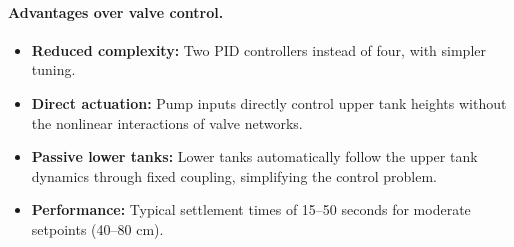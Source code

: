 \documentclass[11pt]{article}
\begin{document}
\paragraph{Advantages over valve control.}
\begin{itemize}
  \item \textbf{Reduced complexity:} Two PID controllers instead of four, with simpler tuning.
  \item \textbf{Direct actuation:} Pump inputs directly control upper tank heights without the nonlinear interactions of valve networks.
  \item \textbf{Passive lower tanks:} Lower tanks automatically follow the upper tank dynamics through fixed coupling, simplifying the control problem.
  \item \textbf{Performance:} Typical settlement times of 15--50 seconds for moderate setpoints (40--80 cm).
\end{itemize}
\end{document}

